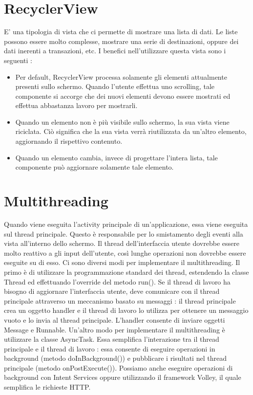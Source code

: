 \documentclass[12pt]{report}
\begin{document}
\section{RecyclerView}
E' una tipologia di vista che ci permette di mostrare una lista di dati. Le liste possono essere molto complesse, mostrare una serie di destinazioni, oppure dei dati inerenti a transazioni, etc. I benefici nell'utilizzare questa vista sono i seguenti :
\begin{itemize}
\item Per default, RecyclerView processa solamente gli elementi attualmente presenti sullo schermo. Quando l'utente effettua uno scrolling, tale componente si accorge che dei nuovi elementi devono essere mostrati ed effettua abbastanza lavoro per mostrarli.
\item Quando un elemento non è più visibile sullo schermo, la sua vista viene riciclata. Ciò significa che la sua vista verrà riutilizzata da un'altro elemento, aggiornando il rispettivo contenuto.
\item Quando un elemento cambia, invece di progettare l'intera lista, tale componente può aggiornare solamente tale elemento.
\end{itemize}
\section{Multithreading}
Quando viene eseguita l'activity principale di un'applicazione, essa viene eseguita sul thread principale. Questo è responsabile per lo smistamento degli eventi alla vista all'interno dello schermo. Il thread dell'interfaccia utente dovrebbe essere molto reattivo a gli input dell'utente, così lunghe operazioni non dovrebbe essere eseguite su di esso. Ci sono diversi modi per implementare il multithreading. Il primo è di utilizzare la programmazione standard dei thread, estendendo la classe Thread ed effettuando l'override del metodo run(). Se il thread di lavoro ha bisogno di aggiornare l'interfaccia utente, deve comunicare con il thread principale attraverso un meccanismo basato su messaggi : il thread principale crea un oggetto handler e il thread di lavoro lo utilizza per ottenere un messaggio vuoto e lo invia al thread principale. L'handler consente di inviare oggetti Message e Runnable. Un'altro modo per implementare il multithreading è utilizzare la classe AsyncTask. Essa semplifica l'interazione tra il thread principale e il thread di lavoro : essa consente di eseguire operazioni in background (metodo doInBackground()) e pubblicare i risultati nel thread principale (metodo onPostExecute()). Possiamo anche eseguire operazioni di background con Intent Services oppure utilizzando il framework Volley, il quale semplifica le richieste HTTP.
\end{document}
